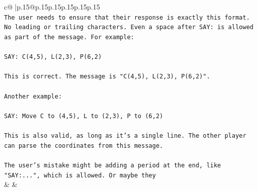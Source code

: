 \documentclass{article}
\begin{document}
{\begin{supertabular}{c@{$\;$}|p{.15\linewidth}@{}p{.15\linewidth}p{.15\linewidth}p{.15\linewidth}p{.15\linewidth}p{.15\linewidth}}
{{{\\ 
\texttt{The user needs to ensure that their response is exactly this format. No leading or trailing characters. Even a space after SAY: is allowed as part of the message. For example:} \\
\\ 
\texttt{SAY: C(4,5), L(2,3), P(6,2)} \\
\\ 
\texttt{This is correct. The message is "C(4,5), L(2,3), P(6,2)".} \\
\\ 
\texttt{Another example:} \\
\\ 
\texttt{SAY: Move C to (4,5), L to (2,3), P to (6,2)} \\
\\ 
\texttt{This is also valid, as long as it's a single line. The other player can parse the coordinates from this message.} \\
\\ 
\texttt{The user's mistake might be adding a period at the end, like "SAY:...", which is allowed. Or maybe they} \\
            }
        }
    }
    & & \\ \\


\end{supertabular}}
\end{document}
